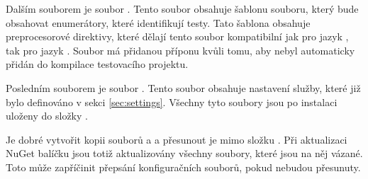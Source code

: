 Dalším souborem je soubor . Tento soubor obsahuje šablonu souboru, který bude obsahovat enumerátory, které identifikují testy. Tato šablona obsahuje preprocesorové direktivy, které dělají tento soubor kompatibilní jak pro jazyk \csharp{}, tak pro jazyk \cpp{}. Soubor má přidanou příponu  kvůli tomu, aby nebyl automaticky přidán do kompilace testovacího projektu.

Posledním souborem je soubor . Tento soubor obsahuje nastavení služby, které již bylo definováno v sekci \ref{sec:settings}. Všechny tyto soubory jsou po instalaci uloženy do složky .

Je dobré vytvořit kopii souborů  a  a přesunout je mimo složku . Při aktualizaci NuGet balíčku jsou totiž aktualizovány všechny soubory, které jsou na něj vázané. Toto může zapříčinit přepsání konfiguračních souborů, pokud nebudou přesunuty. 

